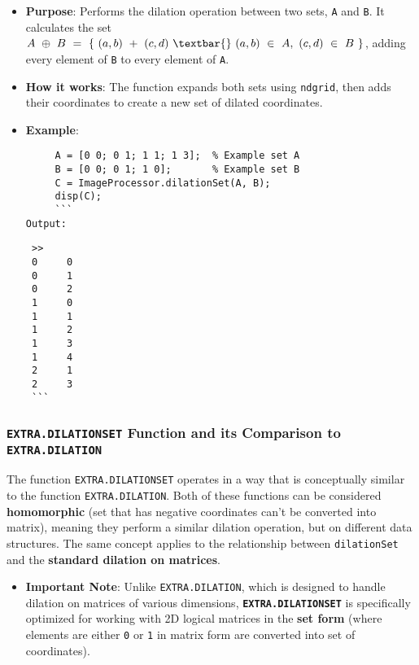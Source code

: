 \documentclass[11pt]{amsart}
\theoremstyle{remark}
\providecommand{\tightlist}{%
  \setlength{\itemsep}{0pt}\setlength{\parskip}{0pt}}
\theoremstyle{definition}
\theoremstyle{remark}
\numberwithin{equation}{section}
\begin{document}
\begin{itemize}
\item
  \textbf{Purpose}: Performs the dilation operation between two sets,
  \texttt{A} and \texttt{B}. It calculates the set
  \texttt{$A\ \oplus\ B\ =\ \{\ (a,b)\ +\ (c,d)\ \textbar{}\ (a,b)\ \in\ A,\ (c,d)\ \in\ B\ \}$},
  adding every element of \texttt{B} to every element of \texttt{A}.
\item
  \textbf{How it works}: The function expands both sets using
  \texttt{ndgrid}, then adds their coordinates to create a new set of
  dilated coordinates.
\item
  \textbf{Example}:

\begin{verbatim}
     A = [0 0; 0 1; 1 1; 1 3];  % Example set A
     B = [0 0; 0 1; 1 0];       % Example set B
     C = ImageProcessor.dilationSet(A, B);
     disp(C);
     ```
Output:
\end{verbatim}

\begin{verbatim}
 >> 
 0     0
 0     1
 0     2
 1     0
 1     1
 1     2
 1     3
 1     4
 2     1
 2     3
 ```
\end{verbatim}
\end{itemize}

\subsubsection{\texorpdfstring{\texttt{EXTRA.DILATIONSET} Function and
its Comparison to
\texttt{EXTRA.DILATION}}{EXTRA.DILATIONSET Function and its Comparison to EXTRA.DILATION}}\label{extra.dilationset-function-and-its-comparison-to-extra.dilation}

The function \texttt{EXTRA.DILATIONSET} operates in a way that is
conceptually similar to the function \texttt{EXTRA.DILATION}. Both of
these functions can be considered \textbf{homomorphic} (set that has
negative coordinates can't be converted into matrix), meaning they
perform a similar dilation operation, but on different data structures.
The same concept applies to the relationship between
\texttt{dilationSet} and the \textbf{standard dilation on matrices}.

\begin{itemize}
\tightlist
\item
  \textbf{Important Note}: Unlike \texttt{EXTRA.DILATION}, which is
  designed to handle dilation on matrices of various dimensions,
  \textbf{\texttt{EXTRA.DILATIONSET}} is specifically optimized for
  working with 2D logical matrices in the \textbf{set form} (where
  elements are either \texttt{0} or \texttt{1} in matrix form are
  converted into set of coordinates).
\end{itemize}
\end{document}
